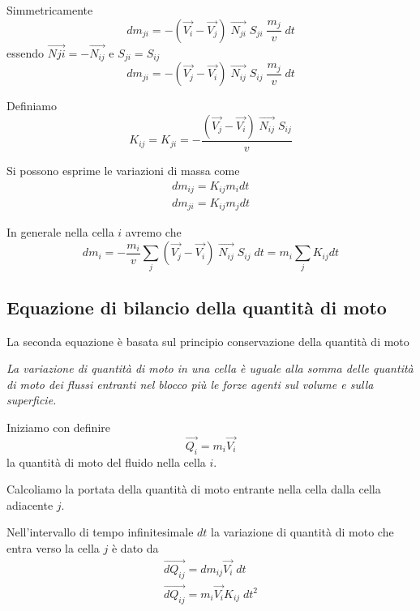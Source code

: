 \documentclass[a4paper,11pt]{article}
\begin{document}
Simmetricamente
\begin{equation}
	d m_{ji} = -( \vec{V_i} - \vec{V_j}) \; \vec{N_{ji}} \; S_{ji} \; \frac{m_j}{v} \; dt
\end{equation}
essendo $ \vec{N{ji}} = -\vec{N_{ij}} $ e $ S_{ji} = S_{ij} $ 
\begin{equation}
	d m_{ji} = -( \vec{V_j} - \vec{V_i}) \; \vec{N_{ij}} \; S_{ij} \; \frac{m_j}{v} \; dt
\end{equation}

Definiamo
\begin{equation}
  K_{ij} = K_{ji} = -\frac{( \vec{V_j} - \vec{V_i}) \; \vec{N_{ij}} \; S_{ij}}{v}
\end{equation}

Si possono esprime le variazioni di massa come
\begin{eqnarray}
  d m_{ij} =   K_{ij} m_i dt
\\
  d m_{ji} =   K_{ij} m_j dt
\end{eqnarray}

In generale nella cella $ i $ avremo che
\begin{equation}
     dm_i = -\frac{m_i}{v} \sum_j \left( \vec{V_j} - \vec{V_i}\right) \; \vec{N_{ij}} \; S_{ij} \; dt = m_i \sum_j K_{ij} dt
\end{equation}


\subsection{Equazione di bilancio della quantità di moto}

La seconda equazione è basata sul principio conservazione della quantità di moto

\emph{
La variazione di quantità di moto in una cella è uguale alla somma delle quantità
di moto dei flussi entranti nel blocco più le forze agenti sul volume e sulla superficie.
}
 
Iniziamo con definire
\begin{equation}
       \vec{Q_i} = m_i \vec{V_i}
\end{equation}
la quantità di moto del fluido nella cella $ i $.

Calcoliamo la portata della quantità di moto entrante nella cella dalla cella adiacente $ j $.

Nell'intervallo di tempo infinitesimale $ dt $ la variazione di quantità di moto che entra verso la cella $ j $ è dato da  
\begin{eqnarray}
  \vec{dQ_{ij}} = dm_{ij} \vec{V_i} \; dt
  \\
  \vec{dQ_{ij}} = m_i \vec{V_i} K_{ij} \; dt^2  
\end{eqnarray}
\end{document}
